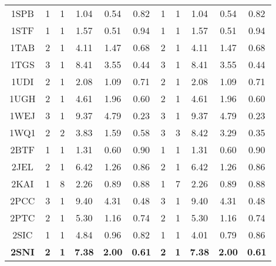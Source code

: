 \begin{longtable}{c c c c c c|c c c c c}
 {\tiny 1SPB}&{\tiny 1}&{\tiny 1}&{\tiny 1.04}&{\tiny 0.54}&{\tiny 0.82}&{\tiny 1}&{\tiny 1}&{\tiny 1.04}&{\tiny 0.54}&{\tiny 0.82}\\ 
 {\tiny 1STF}&{\tiny 1}&{\tiny 1}&{\tiny 1.57}&{\tiny 0.51}&{\tiny 0.94}&{\tiny 1}&{\tiny 1}&{\tiny 1.57}&{\tiny 0.51}&{\tiny 0.94}\\ 
 {\tiny 1TAB}&{\tiny 2}&{\tiny 1}&{\tiny 4.11}&{\tiny 1.47}&{\tiny 0.68}&{\tiny 2}&{\tiny 1}&{\tiny 4.11}&{\tiny 1.47}&{\tiny 0.68}\\ 
 {\tiny 1TGS}&{\tiny 3}&{\tiny 1}&{\tiny 8.41}&{\tiny 3.55}&{\tiny 0.44}&{\tiny 3}&{\tiny 1}&{\tiny 8.41}&{\tiny 3.55}&{\tiny 0.44}\\ 
 {\tiny 1UDI}&{\tiny 2}&{\tiny 1}&{\tiny 2.08}&{\tiny 1.09}&{\tiny 0.71}&{\tiny 2}&{\tiny 1}&{\tiny 2.08}&{\tiny 1.09}&{\tiny 0.71}\\ 
 {\tiny 1UGH}&{\tiny 2}&{\tiny 1}&{\tiny 4.61}&{\tiny 1.96}&{\tiny 0.60}&{\tiny 2}&{\tiny 1}&{\tiny 4.61}&{\tiny 1.96}&{\tiny 0.60}\\ 
 {\tiny 1WEJ}&{\tiny 3}&{\tiny 1}&{\tiny 9.37}&{\tiny 4.79}&{\tiny 0.23}&{\tiny 3}&{\tiny 1}&{\tiny 9.37}&{\tiny 4.79}&{\tiny 0.23}\\ 
 {\tiny 1WQ1}&{\tiny 2}&{\tiny 2}&{\tiny 3.83}&{\tiny 1.59}&{\tiny 0.58}&{\tiny 3}&{\tiny 3}&{\tiny 8.42}&{\tiny 3.29}&{\tiny 0.35}\\ 
 {\tiny 2BTF}&{\tiny 1}&{\tiny 1}&{\tiny 1.31}&{\tiny 0.60}&{\tiny 0.90}&{\tiny 1}&{\tiny 1}&{\tiny 1.31}&{\tiny 0.60}&{\tiny 0.90}\\ 
 {\tiny 2JEL}&{\tiny 2}&{\tiny 1}&{\tiny 6.42}&{\tiny 1.26}&{\tiny 0.86}&{\tiny 2}&{\tiny 1}&{\tiny 6.42}&{\tiny 1.26}&{\tiny 0.86}\\ 
 {\tiny 2KAI}&{\tiny 1}&{\tiny 8}&{\tiny 2.26}&{\tiny 0.89}&{\tiny 0.88}&{\tiny 1}&{\tiny 7}&{\tiny 2.26}&{\tiny 0.89}&{\tiny 0.88}\\ 
 {\tiny 2PCC}&{\tiny 3}&{\tiny 1}&{\tiny 9.40}&{\tiny 4.31}&{\tiny 0.48}&{\tiny 3}&{\tiny 1}&{\tiny 9.40}&{\tiny 4.31}&{\tiny 0.48}\\ 
 {\tiny 2PTC}&{\tiny 2}&{\tiny 1}&{\tiny 5.30}&{\tiny 1.16}&{\tiny 0.74}&{\tiny 2}&{\tiny 1}&{\tiny 5.30}&{\tiny 1.16}&{\tiny 0.74}\\ 
 {\tiny 2SIC}&{\tiny 1}&{\tiny 1}&{\tiny 4.84}&{\tiny 0.96}&{\tiny 0.82}&{\tiny 1}&{\tiny 1}&{\tiny 4.01}&{\tiny 0.79}&{\tiny 0.86}\\ 
 \textbf{\tiny 2SNI}&\textbf{\tiny 2}&\textbf{\tiny 1}&\textbf{\tiny 7.38}&\textbf{\tiny 2.00}&\textbf{\tiny 0.61}&\textbf{\tiny 2}&\textbf{\tiny 1}&\textbf{\tiny 7.38}&\textbf{\tiny 2.00}&\textbf{\tiny 0.61}\\ 

\end{longtable}
